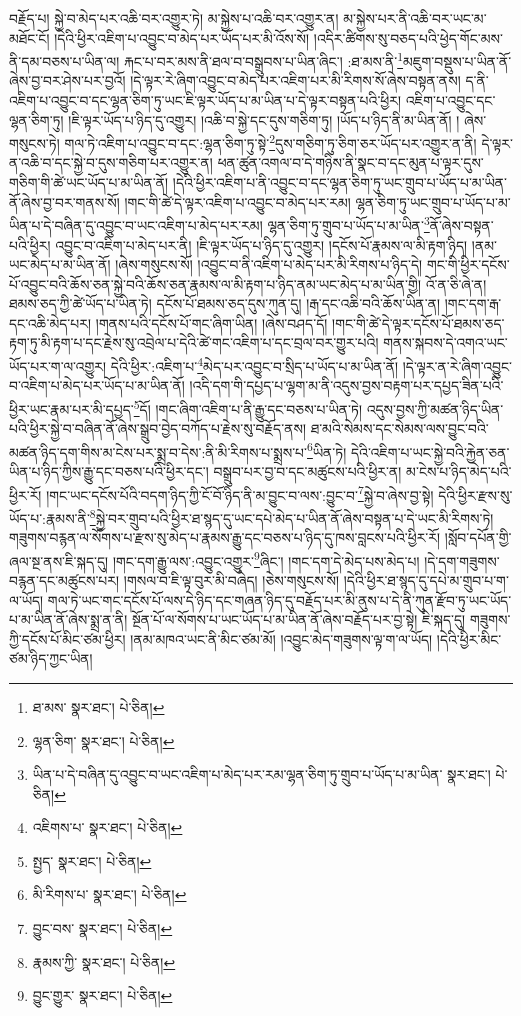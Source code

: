 བརྗོད་པ། སྐྱེ་བ་མེད་པར་འཆི་བར་འགྱུར་ཏེ། མ་སྐྱེས་པ་འཆི་བར་འགྱུར་ན། མ་སྐྱེས་པར་ནི་འཆི་བར་ཡང་མ་མཐོང་ངོ། །དེའི་ཕྱིར་འཇིག་པ་འབྱུང་བ་མེད་པར་ཡོད་པར་མི་འོས་སོ། །འདིར་ཚིགས་སུ་བཅད་པའི་ཕྱེད་གོང་མས་ནི་དམ་བཅས་པ་ཡིན་ལ། རྐང་པ་བར་མས་ནི་ཐལ་བ་བསྒྲུབས་པ་ཡིན་ཞིང་། :ཐ་མས་ནི་\footnote{ཐ་མས་  སྣར་ཐང་།  པེ་ཅིན། }མཇུག་བསྡུས་པ་ཡིན་ནོ་ཞེས་བྱ་བར་ཤེས་པར་བྱའོ། །དེ་ལྟར་རེ་ཞིག་འབྱུང་བ་མེད་པར་འཇིག་པར་མི་རིགས་སོ་ཞེས་བསྟན་ནས། ད་ནི་འཇིག་པ་འབྱུང་བ་དང་ལྷན་ཅིག་ཏུ་ཡང་ཇི་ལྟར་ཡོད་པ་མ་ཡིན་པ་དེ་ལྟར་བསྟན་པའི་ཕྱིར། འཇིག་པ་འབྱུང་དང་ལྷན་ཅིག་ཏུ། །ཇི་ལྟར་ཡོད་པ་ཉིད་དུ་འགྱུར། །འཆི་བ་སྐྱེ་དང་དུས་གཅིག་ཏུ། །ཡོད་པ་ཉིད་ནི་མ་ཡིན་ནོ། །
ཞེས་གསུངས་ཏེ། གལ་ཏེ་འཇིག་པ་འབྱུང་བ་དང་:ལྷན་ཅིག་ཏུ་སྟེ་\footnote{ལྷན་ཅིག་  སྣར་ཐང་།  པེ་ཅིན། }དུས་གཅིག་ཏུ་ཅིག་ཅར་ཡོད་པར་འགྱུར་ན་ནི། དེ་ལྟར་ན་འཆི་བ་དང་སྐྱེ་བ་དུས་གཅིག་པར་འགྱུར་ན། ཕན་ཚུན་འགལ་བ་དེ་གཉིས་ནི་སྣང་བ་དང་མུན་པ་ལྟར་དུས་གཅིག་གི་ཚེ་ཡང་ཡོད་པ་མ་ཡིན་ནོ། །དེའི་ཕྱིར་འཇིག་པ་ནི་འབྱུང་བ་དང་ལྷན་ཅིག་ཏུ་ཡང་གྲུབ་པ་ཡོད་པ་མ་ཡིན་ནོ་ཞེས་བྱ་བར་གནས་སོ། །གང་གི་ཚེ་དེ་ལྟར་འཇིག་པ་འབྱུང་བ་མེད་པར་རམ། ལྷན་ཅིག་ཏུ་ཡང་གྲུབ་པ་ཡོད་པ་མ་ཡིན་པ་དེ་བཞིན་དུ་འབྱུང་བ་ཡང་འཇིག་པ་མེད་པར་རམ། ལྷན་ཅིག་ཏུ་གྲུབ་པ་ཡོད་པ་མ་ཡིན་\footnote{ཡིན་པ་དེ་བཞིན་དུ་འབྱུང་བ་ཡང་འཇིག་པ་མེད་པར་རམ་ལྷན་ཅིག་ཏུ་གྲུབ་པ་ཡོད་པ་མ་ཡིན་  སྣར་ཐང་།  པེ་ཅིན། }ནོ་ཞེས་བསྟན་པའི་ཕྱིར། འབྱུང་བ་འཇིག་པ་མེད་པར་ནི། །ཇི་ལྟར་ཡོད་པ་ཉིད་དུ་འགྱུར། །དངོས་པོ་རྣམས་ལ་མི་རྟག་ཉིད། །ནམ་ཡང་མེད་པ་མ་ཡིན་ནོ། །ཞེས་གསུངས་སོ། །འབྱུང་བ་ནི་འཇིག་པ་མེད་པར་མི་རིགས་པ་ཉིད་དེ། གང་གི་ཕྱིར་དངོས་པོ་འབྱུང་བའི་ཆོས་ཅན་སྐྱེ་བའི་ཆོས་ཅན་རྣམས་ལ་མི་རྟག་པ་ཉིད་ནམ་ཡང་མེད་པ་མ་ཡིན་གྱི། འོ་ན་ཅི་ཞེ་ན། ཐམས་ཅད་ཀྱི་ཚེ་ཡོད་པ་ཡིན་ཏེ། དངོས་པོ་ཐམས་ཅད་དུས་ཀུན་དུ། །རྒ་དང་འཆི་བའི་ཆོས་ཡིན་ན། །གང་དག་རྒ་དང་འཆི་མེད་པར། །གནས་པའི་དངོས་པོ་གང་ཞིག་ཡིན། །ཞེས་བཤད་དོ། །གང་གི་ཚེ་དེ་ལྟར་དངོས་པོ་ཐམས་ཅད་རྟག་ཏུ་མི་རྟག་པ་དང་རྗེས་སུ་འབྲེལ་པ་དེའི་ཚེ་གང་འཇིག་པ་དང་བྲལ་བར་གྱུར་པའི། གནས་སྐབས་དེ་འགའ་ཡང་ཡོད་པར་ག་ལ་འགྱུར། དེའི་ཕྱིར་:འཇིག་པ་\footnote{འཇིགས་པ་  སྣར་ཐང་།  པེ་ཅིན། }མེད་པར་འབྱུང་བ་སྲིད་པ་ཡོད་པ་མ་ཡིན་ནོ། །དེ་ལྟར་ན་རེ་ཞིག་འབྱུང་བ་འཇིག་པ་མེད་པར་ཡོད་པ་མ་ཡིན་ནོ། །འདི་དག་གི་དཔྱད་པ་ལྷག་མ་ནི་འདུས་བྱས་བརྟག་པར་དཔྱད་ཟིན་པའི་ཕྱིར་ཡང་རྣམ་པར་མི་དཔྱད་\footnote{སྤྱད་  སྣར་ཐང་།  པེ་ཅིན། }དོ། །གང་ཞིག་འཇིག་པ་ནི་རྒྱུ་དང་བཅས་པ་ཡིན་ཏེ། འདུས་བྱས་ཀྱི་མཚན་ཉིད་ཡིན་པའི་ཕྱིར་སྐྱེ་བ་བཞིན་ནོ་ཞེས་སྒྲུབ་བྱེད་བཀོད་པ་རྗེས་སུ་བརྗོད་ནས། ཐ་མའི་སེམས་དང་སེམས་ལས་བྱུང་བའི་མཚན་ཉིད་དག་གིས་མ་ངེས་པར་སྨྲ་བ་དེས་:ནི་མི་རིགས་པ་སྨྲས་པ་\footnote{མི་རིགས་པ་  སྣར་ཐང་།  པེ་ཅིན། }ཡིན་ཏེ། དེའི་འཇིག་པ་ཡང་སྐྱེ་བའི་རྐྱེན་ཅན་ཡིན་པ་ཉིད་ཀྱིས་རྒྱུ་དང་བཅས་པའི་ཕྱིར་དང་། བསྒྲུབ་པར་བྱ་བ་དང་མཚུངས་པའི་ཕྱིར་ན། མ་ངེས་པ་ཉིད་མེད་པའི་ཕྱིར་རོ། །གང་ཡང་དངོས་པོའི་བདག་ཉིད་ཀྱི་ངོ་བོ་ཉིད་ནི་མ་བྱུང་བ་ལས་:བྱུང་བ་\footnote{བྱུང་བས་  སྣར་ཐང་།  པེ་ཅིན། }སྐྱེ་བ་ཞེས་བྱ་སྟེ། དེའི་ཕྱིར་རྫས་སུ་ཡོད་པ་:རྣམས་ནི་\footnote{རྣམས་ཀྱི་  སྣར་ཐང་།  པེ་ཅིན། }སྐྱེ་བར་གྲུབ་པའི་ཕྱིར་ཐ་སྙད་དུ་ཡང་དཔེ་མེད་པ་ཡིན་ནོ་ཞེས་བསྟན་པ་དེ་ཡང་མི་རིགས་ཏེ། གཟུགས་བརྙན་ལ་སོགས་པ་རྫས་སུ་མེད་པ་རྣམས་རྒྱུ་དང་བཅས་པ་ཉིད་དུ་ཁས་བླངས་པའི་ཕྱིར་རོ། །སློབ་དཔོན་གྱི་ཞལ་སྔ་ནས་ཇི་སྐད་དུ། །གང་དག་རྒྱུ་ལས་:འབྱུང་འགྱུར་\footnote{བྱུང་གྱུར་  སྣར་ཐང་།  པེ་ཅིན། }ཞིང་། །གང་དག་དེ་མེད་པས་མེད་པ། །དེ་དག་གཟུགས་བརྙན་དང་མཚུངས་པར། །གསལ་བ་ཇི་ལྟ་བུར་མི་བཞེད། །ཅེས་གསུངས་སོ། །དེའི་ཕྱིར་ཐ་སྙད་དུ་དཔེ་མ་གྲུབ་པ་ག་ལ་ཡོད། གལ་ཏེ་ཡང་གང་དངོས་པོ་ལས་དེ་ཉིད་དང་གཞན་ཉིད་དུ་བརྗོད་པར་མི་ནུས་པ་དེ་ནི་ཀུན་རྫོབ་ཏུ་ཡང་ཡོད་པ་མ་ཡིན་ནོ་ཞེས་སྨྲ་ན་ནི། སྔོན་པོ་ལ་སོགས་པ་ཡང་ཡོད་པ་མ་ཡིན་ནོ་ཞེས་བརྗོད་པར་བྱ་སྟེ། ཇི་སྐད་དུ། གཟུགས་ཀྱི་དངོས་པོ་མིང་ཙམ་ཕྱིར། །ནམ་མཁའ་ཡང་ནི་མིང་ཙམ་མོ། །འབྱུང་མེད་གཟུགས་ལྟ་ག་ལ་ཡོད། །དེའི་ཕྱིར་མིང་ཙམ་ཉིད་ཀྱང་ཡིན། 